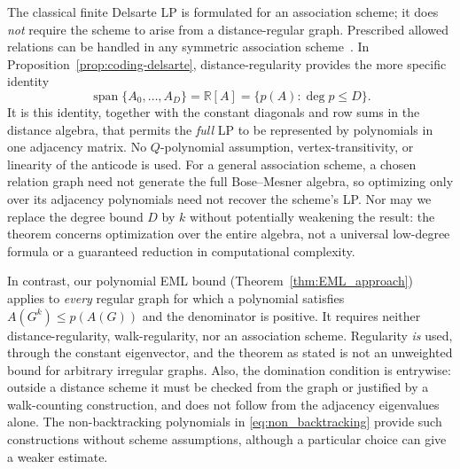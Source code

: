 \documentclass[10pt,a4paper]{article}
\theoremstyle{plain}
\numberwithin{equation}{section}
\begin{document}
The classical finite Delsarte LP is formulated for an association scheme; it does \emph{not} require the scheme to arise from a distance-regular graph. Prescribed allowed relations can be handled in any symmetric association scheme~\cite{Delsarte_1973,Schrijver_1979}. In Proposition~\ref{prop:coding-delsarte}, distance-regularity provides the more specific identity
\[
 \operatorname{span}\{A_0,\ldots,A_D\}=\mathbb R[A]
   =\{p(A):\deg p\le D\}.
\]
It is this identity, together with the constant diagonals and row sums in the distance algebra, that permits the \emph{full} LP to be represented by polynomials in one adjacency matrix. No $Q$-polynomial assumption, vertex-transitivity, or linearity of the anticode is used. For a general association scheme, a chosen relation graph need not generate the full Bose--Mesner algebra, so optimizing only over its adjacency polynomials need not recover the scheme's LP. Nor may we replace the degree bound $D$ by $k$ without potentially weakening the result: the theorem concerns optimization over the entire algebra, not a universal low-degree formula or a guaranteed reduction in computational complexity.

In contrast, our polynomial EML bound (Theorem~\ref{thm:EML_approach}) applies to \emph{every} regular graph for which a polynomial satisfies $A(G^k)\le p(A(G))$ and the denominator is positive. It requires neither distance-regularity, walk-regularity, nor an association scheme. Regularity \emph{is} used, through the constant eigenvector, and the theorem as stated is not an unweighted bound for arbitrary irregular graphs. Also, the domination condition is entrywise: outside a distance scheme it must be checked from the graph or justified by a walk-counting construction, and does not follow from the adjacency eigenvalues alone. The non-backtracking polynomials in \eqref{eq:non_backtracking} provide such constructions without scheme assumptions, although a particular choice can give a weaker estimate.

\end{document}
